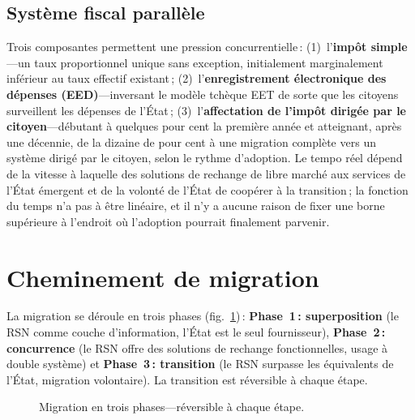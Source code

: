 \documentclass[11pt,a4paper,twocolumn]{article}
\begin{document}
\subsection{Système fiscal parallèle}

Trois composantes permettent une pression concurrentielle\,: (1)~l'\textbf{impôt simple}---un taux proportionnel unique sans exception, initialement marginalement inférieur au taux effectif existant\,; (2)~l'\textbf{enregistrement électronique des dépenses (EED)}---inversant le modèle tchèque EET de sorte que les citoyens surveillent les dépenses de l'État\,; (3)~l'\textbf{affectation de l'impôt dirigée par le citoyen}---débutant à quelques pour cent la première année et atteignant, après une décennie, de la dizaine de pour cent à une migration complète vers un système dirigé par le citoyen, selon le rythme d'adoption. Le tempo réel dépend de la vitesse à laquelle des solutions de rechange de libre marché aux services de l'État émergent et de la volonté de l'État de coopérer à la transition\,; la fonction du temps n'a pas à être linéaire, et il n'y a aucune raison de fixer une borne supérieure à l'endroit où l'adoption pourrait finalement parvenir.

\section{Cheminement de migration}

La migration se déroule en trois phases (fig.~\ref{fig:migration})\,: \textbf{Phase~1\,: superposition} (le RSN comme couche d'information, l'État est le seul fournisseur), \textbf{Phase~2\,: concurrence} (le RSN offre des solutions de rechange fonctionnelles, usage à double système) et \textbf{Phase~3\,: transition} (le RSN surpasse les équivalents de l'État, migration volontaire). La transition est réversible à chaque étape.

\begin{figure}[ht]
\centering
{}
\caption{Migration en trois phases---réversible à chaque étape.}
\label{fig:migration}
\end{figure}
\end{document}
